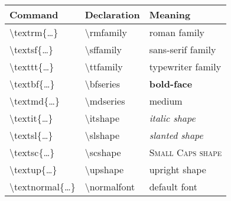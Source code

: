 \documentclass{article}
\renewcommand*\c{\ttfamily\textbackslash}
\begin{document}
\sffamily
\begin{tabular}{lll}
\toprule
\textbf{Command} & \textbf{Declaration} & \textbf{Meaning} \\
\midrule
\c textrm\{\ldots\}     & \c rmfamily   & \normalfont\rmfamily roman family      \\
\c textsf\{\ldots\}     & \c sffamily   & \normalfont\sffamily sans-serif family \\
\c texttt\{\ldots\}     & \c ttfamily   & \normalfont\ttfamily typewriter family \\
\c textbf\{\ldots\}     & \c bfseries   & \normalfont\bfseries bold-face         \\
\c textmd\{\ldots\}     & \c mdseries   & \normalfont\mdseries medium            \\
\c textit\{\ldots\}     & \c itshape    & \normalfont\itshape  italic shape      \\
\c textsl\{\ldots\}     & \c slshape    & \normalfont\slshape  slanted shape     \\
\c textsc\{\ldots\}     & \c scshape    & \normalfont\scshape  Small Caps shape  \\
\c textup\{\ldots\}     & \c upshape    & \normalfont\upshape  upright shape     \\
\c textnormal\{\ldots\} & \c normalfont & \normalfont          default font      \\
\bottomrule
\end{tabular}
\end{document}
